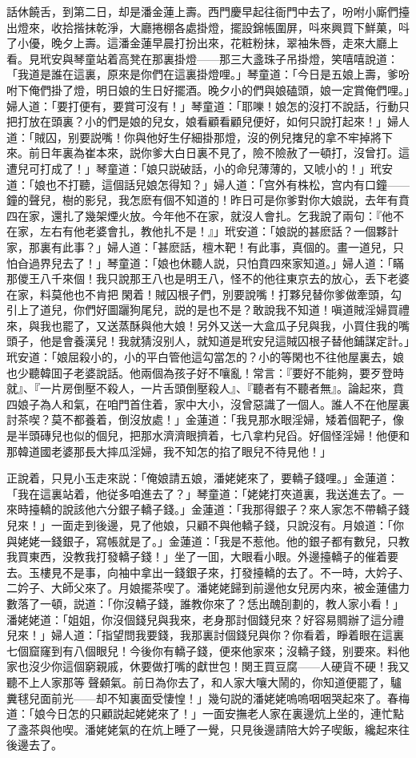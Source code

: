 話休饒舌，到第二日，却是潘金蓮上壽。西門慶早起往衙門中去了，吩咐小廝們擡出燈來，收拾揩抹乾淨，大廳捲棚各處掛燈，擺設錦帳圍屏，呌來興買下鮮菓，呌了小優，晚夕上壽。這潘金蓮早晨打扮出來，花粧粉抹，翠袖朱唇，走來大廳上看。見玳安與琴童站着高凳在那裏掛燈——那三大盞珠子吊掛燈，笑嘻嘻說道：「我道是誰在這裏，原來是你們在這裏掛燈哩。」琴童道：「今日是五娘上壽，爹吩咐下俺們掛了燈，明日娘的生日好擺酒。晚夕小的們與娘磕頭，娘一定賞俺們哩。」婦人道：「要打便有，要賞可沒有！」琴童道：「耶嚛！娘怎的沒打不說話，行動只把打放在頭裏？小的們是娘的兒女，娘看顧看顧兒便好，如何只說打起來！」婦人道：「賊囚，别要説嘴！你與他好生仔細掛那燈，沒的例兒撦兒的拿不牢掉將下來。前日年裏為崔本來，説你爹大白日裏不見了，險不險赦了一頓打，沒曾打。這遭兒可打成了！」琴童道：「娘只説破話，小的命兒薄薄的，又唬小的！」玳安道：「娘也不打聽，這個話兒娘怎得知？」婦人道：「宫外有株松，宫内有口鐘——鐘的聲兒，樹的影兒，我怎麽有個不知道的！昨日可是你爹對你大娘説，去年有賁四在家，還扎了幾架煙火放。今年他不在家，就沒人會扎。乞我說了兩句：『他不在家，左右有他老婆會扎，教他扎不是！』」玳安道：「娘説的甚麽話？一個夥計家，那裏有此事？」婦人道：「甚麽話，檀木靶！有此事，真個的。畫一道兒，只怕㒲過界兒去了！」琴童道：「娘也休聽人説，只怕賁四來家知道。」婦人道：「瞞那儍王八千來個！我只說那王八也是明王八，怪不的他往東京去的放心，丢下老婆在家，料莫他也不肯把𣭈閑着！賊囚根子們，別要說嘴！打夥兒替你爹做牽頭，勾引上了道兒，你們好圖躧狗尾兒，説的是也不是？敢說我不知道！嗔道賊淫婦買禮來，與我也罷了，又送蒸酥與他大娘！另外又送一大盒瓜子兒與我，小買住我的嘴頭子，他是會養漢兒！我就猜沒别人，就知道是玳安兒這賊囚根子替他鋪謀定計。」玳安道：「娘屈殺小的，小的平白管他這勾當怎的？小的等閑也不往他屋裏去，娘也少聽韓囬子老婆說話。他兩個為孩子好不嚷亂！常言：『要好不能夠，要歹登時就』、『一片房倒壓不殺人，一片舌頭倒壓殺人』、『聽者有不聽者無』。論起來，賁四娘子為人和氣，在咱門首住着，家中大小，沒曾惡識了一個人。誰人不在他屋裏討茶喫？莫不都養着，倒沒放處！」金蓮道：「我見那水眼淫婦，矮着個靶子，像是半頭磚兒也似的個兒，把那水濟濟眼擠着，七八拿杓兒舀。好個怪淫婦！他便和那韓道國老婆那長大摔瓜淫婦，我不知怎的掐了眼兒不待見他！」

正說着，只見小玉走來説：「俺娘請五娘，潘姥姥來了，要轎子錢哩。」金蓮道：「我在這裏站着，他従多咱進去了？」琴童道：「姥姥打夾道裏，我送進去了。一來時擡轎的說該他六分銀子轎子錢。」金蓮道：「我那得銀子？來人家怎不帶轎子錢兒來！」一面走到後邊，見了他娘，只顧不與他轎子錢，只說沒有。月娘道：「你與姥姥一錢銀子，寫帳就是了。」金蓮道：「我是不惹他。他的銀子都有數兒，只教我買東西，没教我打發轎子錢！」坐了一囬，大眼看小眼。外邊擡轎子的催着要去。玉樓見不是事，向袖中拿出一錢銀子來，打發擡轎的去了。不一時，大妗子、二妗子、大師父來了。月娘擺茶喫了。潘姥姥歸到前邊他女兒房内來，被金蓮儘力數落了一頓，説道：「你沒轎子錢，誰教你來了？恁出醜㓦劃的，教人家小看！」潘姥姥道：「姐姐，你沒個錢兒與我來，老身那討個錢兒來？好容易賙辦了這分禮兒來！」婦人道：「指望問我要錢，我那裏討個錢兒與你？你看着，睜着眼在這裏七個窟窿到有八個眼兒！今後你有轎子錢，便來他家來；沒轎子錢，别要來。料他家也沒少你這個窮親戚，休要做打嘴的獻世包！関王買豆腐——人硬貨不硬！我又聽不上人家那等𣭈聲顙氣。前日為你去了，和人家大嚷大鬧的，你知道便罷了，驢糞毬兒面前光——却不知裏面受悽惶！」幾句説的潘姥姥嗚嗚咽咽哭起來了。春梅道：「娘今日怎的只顧説起姥姥來了！」一面安撫老人家在裏邊炕上坐的，連忙點了盞茶與他喫。潘姥姥氣的在炕上睡了一覺，只見後邊請陪大妗子喫飯，纔起來往後邊去了。

